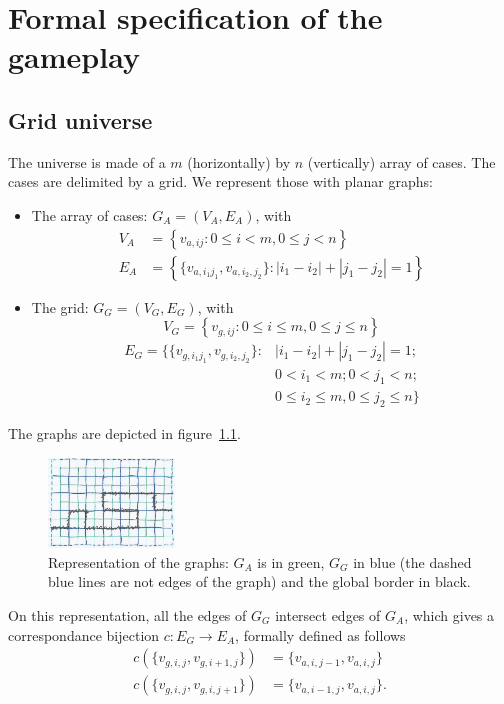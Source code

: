 
\chapter{Formal specification of the gameplay}
\label{chap:formal}

\section{Grid universe}

The universe is made of a $m$ (horizontally) by $n$ (vertically) array of cases.
The cases are delimited by a grid.
We represent those with planar graphs:
\begin{itemize}
    \item The array of cases: $G_A = (V_A, E_A)$, with
        \begin{align*}
            V_A &= \left\{v_{a,ij} : 0 \le i < m, 0 \le j < n\right\} \\
            E_A &= \left\{\{v_{a,i_1j_1}, v_{a,i_2,j_2}\} :
            |i_1-i_2| + |j_1-j_2| = 1 \right\}
        \end{align*}
    \item The grid: $G_G = (V_G, E_G)$, with
        \[V_G = \left\{v_{g,ij} : 0 \le i \le m, 0 \le j \le n\right\} \]
        \[
            \begin{split}
                E_G = \{
                    \{v_{g,i_1j_1}, v_{g,i_2,j_2}\} :
                    & |i_1-i_2| + |j_1-j_2| = 1; \\
                    & 0 < i_1 < m; 0 < j_1 < n; \\
                    & 0 \le i_2 \le m, 0 \le j_2 \le n
                \}
            \end{split}
        \]
\end{itemize}
The graphs are depicted in figure~\ref{fig:graphs1}.
\begin{figure}
    \begin{center}
        \includegraphics[width=0.3\textwidth]{img/graphs_universe_draft.png}
    \end{center}
    \caption{Representation of the graphs: $G_A$ is in green, $G_G$ in blue
        (the dashed blue lines are not edges of the graph) and the global border
        in black.
    }
    \label{fig:graphs1}
\end{figure}
On this representation, all the edges of $G_G$ intersect
edges of $G_A$, which gives a correspondance bijection $c:E_G \rightarrow E_A$,
formally defined as follows
\begin{align*}
    c(\{v_{g,i,j}, v_{g,i+1,j}\}) &= \{v_{a,i,j-1}, v_{a,i,j}\} \\
    c(\{v_{g,i,j}, v_{g,i,j+1}\}) &= \{v_{a,i-1,j}, v_{a,i,j}\}.
\end{align*}

